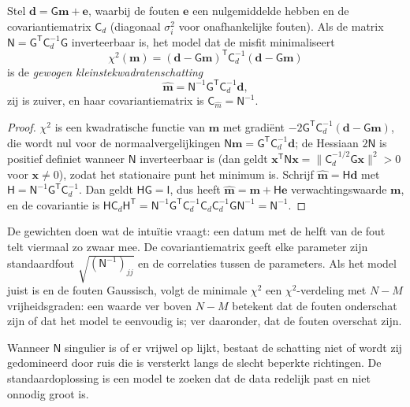 \begin{theorem}\label{thm:b3:seismology-imaging:wls}
Stel $\mathbf d = \mathsf G\mathbf m + \mathbf e$, waarbij de fouten $\mathbf e$
een nulgemiddelde hebben en de covariantiematrix $\mathsf C_d$ (diagonaal
$\sigma_i^2$ voor onafhankelijke fouten). Als de matrix
$\mathsf N = \mathsf G^{\mathsf T}\mathsf C_d^{-1}\mathsf G$ inverteerbaar is, het
model dat de misfit minimaliseert
\[
  \chi^2(\mathbf m) = (\mathbf d - \mathsf G\mathbf m)^{\mathsf T}\mathsf C_d^{-1}
  (\mathbf d - \mathsf G\mathbf m)
\]
is de \emph{gewogen kleinstekwadratenschatting}
\[
  \hat{\mathbf m} = \mathsf N^{-1}\mathsf G^{\mathsf T}\mathsf C_d^{-1}\mathbf d ,
\]
zij is zuiver, en haar covariantiematrix is
$\mathsf C_{\hat m} = \mathsf N^{-1}$.
\end{theorem}

\begin{proof}
$\chi^2$ is een kwadratische functie van $\mathbf m$ met gradiënt
$-2\mathsf G^{\mathsf T}\mathsf C_d^{-1}(\mathbf d - \mathsf G\mathbf m)$, die
wordt nul voor de normaalvergelijkingen $\mathsf N\mathbf m = \mathsf G^{\mathsf T}
\mathsf C_d^{-1}\mathbf d$; de Hessiaan $2\mathsf N$ is positief definiet wanneer
$\mathsf N$ inverteerbaar is (dan geldt $\mathbf x^{\mathsf T}\mathsf N\mathbf x =
\|\mathsf C_d^{-1/2}\mathsf G\mathbf x\|^2 > 0$ voor $\mathbf x \ne 0$), zodat het
stationaire punt het minimum is. Schrijf $\hat{\mathbf m} = \mathsf H\mathbf d$ met
$\mathsf H = \mathsf N^{-1}\mathsf G^{\mathsf T}\mathsf C_d^{-1}$. Dan geldt
$\mathsf H\mathsf G = \mathsf I$, dus heeft $\hat{\mathbf m} = \mathbf m + \mathsf H\mathbf e$
verwachtingswaarde $\mathbf m$, en de covariantie is
$\mathsf H\mathsf C_d\mathsf H^{\mathsf T} =
\mathsf N^{-1}\mathsf G^{\mathsf T}\mathsf C_d^{-1}\mathsf C_d\mathsf C_d^{-1}
\mathsf G\mathsf N^{-1} = \mathsf N^{-1}$.
\end{proof}

De gewichten doen wat de intuïtie vraagt: een datum met de helft van de fout telt
viermaal zo zwaar mee. De covariantiematrix geeft elke parameter zijn standaardfout
$\sqrt{(\mathsf N^{-1})_{jj}}$ en de correlaties tussen de parameters. Als het model
juist is en de fouten Gaussisch, volgt de minimale $\chi^2$ een $\chi^2$-verdeling
met $N - M$ vrijheidsgraden: een waarde ver boven $N - M$ betekent dat de fouten
onderschat zijn of dat het model te eenvoudig is; ver daaronder, dat de fouten
overschat zijn.

Wanneer $\mathsf N$ singulier is of er vrijwel op lijkt, bestaat de schatting niet
of wordt zij gedomineerd door ruis die is versterkt langs de slecht beperkte
richtingen. De standaardoplossing is een model te zoeken dat de data redelijk
past en niet onnodig groot is.

